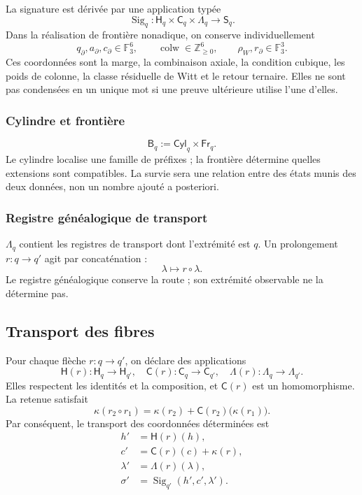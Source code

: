 {La signature est dérivée par une application typée
\[
 \operatorname{Sig}_q:
 \mathsf H_q\times\mathsf C_q\times\Lambda_q
 \longrightarrow\mathsf S_q.
\]
Dans la réalisation de frontière nonadique, on conserve individuellement
\[
 q_\partial,a_\partial,c_\partial\in\mathbb F_3^6,
 \qquad
 \operatorname{colw}\in\mathbb Z_{\geq0}^{6},
 \qquad
 \rho_W,r_\partial\in\mathbb F_3^3.
\]
Ces coordonnées sont la marge, la combinaison axiale, la condition cubique, les poids de
colonne, la classe résiduelle de Witt et le retour ternaire. Elles ne sont pas condensées en un
unique mot si une preuve ultérieure utilise l’une d’elles.

\subsubsection{Cylindre et frontière}

\[
 \mathsf B_q:=\mathsf{Cyl}_q\times\mathsf{Fr}_q.
\]
Le cylindre localise une famille de préfixes ; la frontière détermine quelles
extensions sont compatibles. La survie sera une relation entre
des états munis des deux données, non un nombre ajouté a posteriori.

\subsubsection{Registre généalogique de transport}

\(\Lambda_q\) contient les registres de transport dont l’extrémité est
\(q\). Un prolongement \(r:q\to q'\) agit par concaténation :
\[
 \lambda\longmapsto r\circ\lambda.
\]
Le registre généalogique conserve la route ; son extrémité observable ne la détermine pas.

\subsection{Transport des fibres}

Pour chaque flèche \(r:q\to q'\), on déclare des applications
\[
 \mathsf H(r):\mathsf H_q\to\mathsf H_{q'},
 \quad
 \mathsf C(r):\mathsf C_q\to\mathsf C_{q'},
 \quad
 \Lambda(r):\Lambda_q\to\Lambda_{q'}.
\]
Elles respectent les identités et la composition, et \(\mathsf C(r)\) est un homomorphisme.
La retenue satisfait
\begin{equation}
 \kappa(r_2\circ r_1)
 =\kappa(r_2)+\mathsf C(r_2)\bigl(\kappa(r_1)\bigr).
\label{p12-83-c1-s3:eq:tpk-cocadena-transporte}
\end{equation}
Par conséquent, le transport des coordonnées déterminées est
\begin{align*}
 h'&=\mathsf H(r)(h),\\
 c'&=\mathsf C(r)(c)+\kappa(r),\\
 \lambda'&=\Lambda(r)(\lambda),\\
 \sigma'&=\operatorname{Sig}_{q'}(h',c',\lambda').
\end{align*}

}
